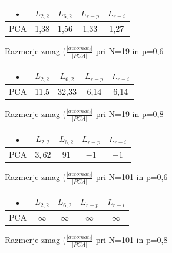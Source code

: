 \documentclass[10pt,a4paper]{report}
\begin{document}
\begin{figure}[h!]
\begin{center}
\begin{tabular}{|c|c|c|c|c|}
\hline • & $L_{2,2}$ & $L_{6,2}$ & $L_{r-p}$ & $L_{r-i}$ \\ 
\hline PCA & 1,38 & 1,56 & 1,33 & 1,27 \\ 
\hline 
\end{tabular} 
\end{center}
\caption{Razmerje zmag ($\frac{|avtomat_i|}{|PCA|}$ pri N=19 in p=0,6}
\end{figure}

\begin{figure}[h!]
\begin{center}
\begin{tabular}{|c|c|c|c|c|}
\hline • & $L_{2,2}$ & $L_{6,2}$ & $L_{r-p}$ & $L_{r-i}$ \\ 
\hline PCA & 11.5 & 32,33 & 6,14 & 6,14 \\ 
\hline 
\end{tabular} 
\end{center}
\caption{Razmerje zmag ($\frac{|avtomat_i|}{|PCA|}$ pri N=19 in p=0,8}
\end{figure}

\begin{figure}[h!]
\begin{center}
\begin{tabular}{|c|c|c|c|c|}
\hline • & $L_{2,2}$ & $L_{6,2}$ & $L_{r-p}$ & $L_{r-i}$ \\ 
\hline PCA & $3,62$ & $91$ & $-1$ & $-1$ \\ 
\hline 
\end{tabular} 
\end{center}
\caption{Razmerje zmag ($\frac{|avtomat_i|}{|PCA|}$ pri N=101 in p=0,6}
\end{figure}

\begin{figure}[h!]
\begin{center}
\begin{tabular}{|c|c|c|c|c|}
\hline • & $L_{2,2}$ & $L_{6,2}$ & $L_{r-p}$ & $L_{r-i}$ \\ 
\hline PCA & $\infty$ & $\infty$ & $\infty$ & $\infty$ \\ 
\hline 
\end{tabular} 
\end{center}
\caption{Razmerje zmag ($\frac{|avtomat_i|}{|PCA|}$ pri N=101 in p=0,8}
\end{figure}
\end{document}
